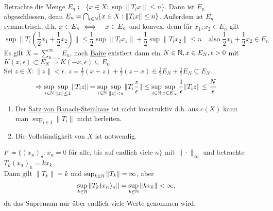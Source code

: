 \begin{beweis}
	Betrachte die Menge $E_{n} \coloneqq \{ x \in X: \sup \| T_{i} x \| \leq n\}$. Dann ist $E_{n}$ abgeschlossen, denn $E_{n} = \bigcap_{i \in \mathbb{N}} \{ x \in X: \| T_{i} x \| \leq n \}$. Außerdem ist $E_{n}$ symmetrisch, d.h. $x \in E_{n} \iff -x \in E_{n}$ und konvex, denn für $x_{1}, x_{2} \in E_{n}$ gilt
		\[ \sup \| T_{i} \left( \frac{1}{2} x_{1} + \frac{1}{2} x_{2} \right) \| \leq \frac{1}{2} \sup \| T_{i} x_{1} \| + \frac{1}{2} \sup \| T_{i} x_{2} \| \leq n \quad \text{also } \frac{1}{2} x_{1} + \frac{1}{2} x_{2} \in E_{n} \]
		Es gilt $X = \sum_{n = 1}^{\infty} E_{n}$, nach \hyperref[satz:9.1-baire]{Baire} existiert dann ein $N \in \mathbb{N}, x \in E_{N}, \epsilon > 0$ mit $K(x, \epsilon) \subset E_{N} \Rightarrow K(-x, \epsilon) \subseteq E_{n}$ \\
		Sei $z \in X: \| z \| < \epsilon$. $z = \frac{1}{2} (x + z) + \frac{1}{2} (z - x) \in \frac{1}{2} E_{N} + \frac{1}{2} E_{N} \subseteq E_{N}$. 
		\[ \Rightarrow \sup_{i \in \mathbb{N}} \sup_{\| z \| \leq 1} \| T_{i} z \| = \sup_{i \in \mathbb{N}} \sup_{\| z \| < \epsilon} \| T_{i} \frac{z}{\epsilon} \| \leq \sup_{i \in \mathbb{N}} \sup_{z \in E_{N}} \frac{1}{\epsilon} \| T_{i} z \| \leq \frac{N}{\epsilon} \]	
\end{beweis}


\begin{bemerkung}  \label{bem:9.6}
	\begin{enumerate}[label=\alph*\upshape)]
		\item Der \hyperref[satz:9.5-Banach-Steinhaus]{Satz von Banach-Steinhaus} ist nicht konstruktiv d.h. aus $c(X)$ kann man $\sup_{i \in I} \| T_{i} \|$ nicht herleiten.
		\item Die Vollständigkeit von $X$ ist notwendig.
	\end{enumerate}	
\end{bemerkung}


\begin{beispiel*}
$F \coloneqq \{ (x_{n})_{n}: x_{n} = 0$ für alle, bis auf endlich viele $n \}$ mit $\| \cdot \|_{\infty}$ und betrachte $T_{k} (x_{n})_{n} = k x_{k}$. \\ 
	Dann gilt $\| T_{k} \| = k$ und $\sup_{k \in \mathbb{N}} \| T_{k} \| = \infty$, aber 
	\[ \sup_{k \in \mathbb{N}} \| T_{k} (x_{n})_{n} \| = \sup_{k \in \mathbb{N}} \| k x_{k} \| < \infty, \]
	da das Supremum nur über endlich viele Werte genommen wird.
\end{beispiel*}



